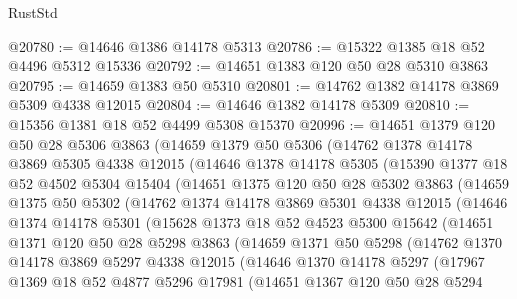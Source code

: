 \begin{lexlean}{RustStd}
\begin{coremodule}
@20780 := @14646 @1386 @14178 @5313
@20786 := @15322 @1385 @18 @52 @4496 @5312 @15336
@20792 := @14651 @1383 @120 @50 @28 @5310 @3863
@20795 := @14659 @1383 @50 @5310
@20801 := @14762 @1382 @14178 @3869 @5309 @4338 @12015
@20804 := @14646 @1382 @14178 @5309
@20810 := @15356 @1381 @18 @52 @4499 @5308 @15370
@20996 := @14651
    @1379
    @120
    @50
    @28
    @5306
    @3863
    (@14659
      @1379
      @50
      @5306
      (@14762
        @1378
        @14178
        @3869
        @5305
        @4338
        @12015
        (@14646
          @1378
          @14178
          @5305
          (@15390
            @1377
            @18
            @52
            @4502
            @5304
            @15404
            (@14651
              @1375
              @120
              @50
              @28
              @5302
              @3863
              (@14659
                @1375
                @50
                @5302
                (@14762
                  @1374
                  @14178
                  @3869
                  @5301
                  @4338
                  @12015
                  (@14646
                    @1374
                    @14178
                    @5301
                    (@15628
                      @1373
                      @18
                      @52
                      @4523
                      @5300
                      @15642
                      (@14651
                        @1371
                        @120
                        @50
                        @28
                        @5298
                        @3863
                        (@14659
                          @1371
                          @50
                          @5298
                          (@14762
                            @1370
                            @14178
                            @3869
                            @5297
                            @4338
                            @12015
                            (@14646
                              @1370
                              @14178
                              @5297
                              (@17967
                                @1369
                                @18
                                @52
                                @4877
                                @5296
                                @17981
                                (@14651
                                  @1367
                                  @120
                                  @50
                                  @28
                                  @5294

\end{coremodule}
\end{lexlean}
